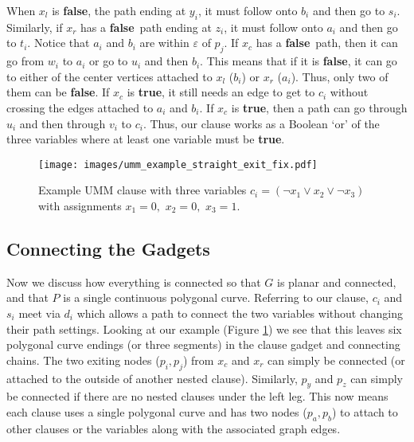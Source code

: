 \documentclass{article}[11pt]
\newcommand{\true}{\textbf{true}}
\newcommand{\false}{\textbf{false}}
\begin{document}
When $x_l$ is \false, the path ending at $y_i$, it must follow onto $b_i$ and then
go to $s_i$.  Similarly, if $x_r$ has a \false\ path ending at $z_i$, it must follow 
onto $a_i$ and then go to $t_i$.  Notice that $a_i$ and $b_i$ are within $\varepsilon$
of $p_j$.  If $x_c$ has a \false\ path, then it can go from $w_i$ to $a_i$ or go to
$u_i$ and then $b_i$.  This means that if it is \false, it can go to either of the 
center vertices attached to $x_l$ ($b_i$) or $x_r$ ($a_i$).  Thus, only two of them
can be \false.  If $x_c$ is \true, it still needs an edge
to get to $c_i$ without crossing the edges attached to $a_i$ and $b_i$.  If $x_c$
is \true, then a path can go through $u_i$ and then through $v_i$ to $c_i$.
Thus, our clause works as a Boolean `or' of the three variables where at least one
variable must be \true.



\begin{figure}[!ht]
\centering
\texttt{[image: images/umm\_example\_straight\_exit\_fix.pdf]}
\caption{Example UMM clause with three variables $c_i=(\lnot x_1 \lor x_2 \lor \lnot x_3)$ with assignments $x_1=0,$ 
    $x_2=0,$ $x_3=1$.}
    \label{fig:umm_example}
\end{figure}





\subsection{Connecting the Gadgets}

Now we discuss how everything is connected so that $G$ is planar and connected, and that $P$ is
a single continuous polygonal curve. Referring to our clause,
$c_i$ and $s_i$ meet via $d_i$ which allows a path to connect the two variables
without changing their path settings.  Looking at our example (Figure \ref{fig:umm_example})
we see that this leaves six polygonal curve endings (or three segments) in the clause gadget and connecting chains.  
The two exiting nodes ($p_i,p_j$)
from $x_c$ and $x_r$ can simply be connected (or attached to the outside of another nested clause).
Similarly, $p_y$ and $p_z$ can simply be connected if there are no nested clauses under the left leg.
This now means each clause uses a single polygonal curve and has two nodes ($p_a,p_b$) to attach to other 
clauses or the variables along with the associated graph edges.
\end{document}
